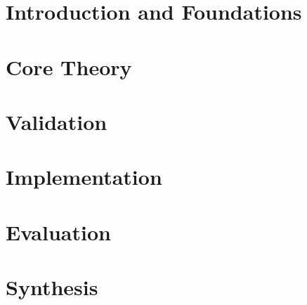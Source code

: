 \documentclass[
    twoside,openright,titlepage,numbers=noenddot,
    headinclude,footinclude,cleardoublepage=empty,
    paper=a4,fontsize=11pt
]{scrreprt}
\begin{document}
\frenchspacing
\raggedbottom
{}
\pagestyle{plain}



\cleardoublepage
\cleardoublepage
\cleardoublepage

\cleardoublepage
\pagestyle{scrheadings}

\part{Introduction and Foundations}




\part{Core Theory}




\part{Validation}


\part{Implementation}





\part{Evaluation}



\part{Synthesis}


\end{document}
